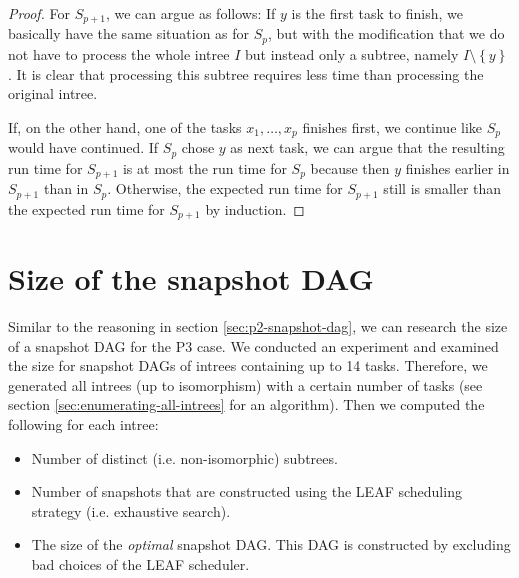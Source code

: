\begin{proof}


  
  For $S_{p+1}$, we can argue as follows: If $y$ is the first task to finish, we basically have the same situation as for $S_p$, but with the modification that we do not have to process the whole intree $I$ but instead only a subtree, namely $I\setminus\left\{ y \right\}$. It is clear that processing this subtree requires less time than processing the original intree.

  If, on the other hand, one of the tasks $x_1,\dots,x_p$ finishes first, we continue like $S_p$ would have continued. If $S_p$ chose $y$ as next task, we can argue that the resulting run time for $S_{p+1}$ is at most the run time for $S_p$ because then $y$ finishes earlier in $S_{p+1}$ than in $S_p$. Otherwise, the expected run time for $S_{p+1}$ still is smaller than the expected run time for $S_{p+1}$ by induction.
\end{proof}

\section{Size of the snapshot DAG}
\label{sec:p3-size-of-snapshot-dag-first-attempts}

Similar to the reasoning in section \ref{sec:p2-snapshot-dag}, we can research the size of a snapshot DAG for the P3 case. 
We conducted an experiment and examined the size for snapshot DAGs of intrees containing up to 14 tasks. 
Therefore, we generated all intrees (up to isomorphism) with a certain number of tasks (see section \ref{sec:enumerating-all-intrees} for an algorithm).
Then we computed the following for each intree:
\begin{itemize}
\item Number of distinct (i.e. non-isomorphic) subtrees.
\item Number of snapshots that are constructed using the LEAF scheduling strategy (i.e. exhaustive search).
\item The size of the \emph{optimal} snapshot DAG. This DAG is constructed by excluding bad choices of the LEAF scheduler.
\end{itemize}

